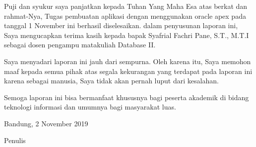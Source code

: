 \begin{acknowledgements}
Puji dan syukur saya panjatkan kepada Tuhan Yang Maha Esa atas berkat dan rahmat-Nya, Tugas pembuatan aplikasi dengan menggunakan oracle apex pada tanggal 1 November ini berhasil diselesaikan. dalam penyusunan laporan ini, Saya mengucapkan terima kasih kepada bapak Syafrial Fachri Pane, S.T., M.T.I sebagai dosen pengampu matakuliah Database II.

Saya menyadari laporan ini jauh dari sempurna. Oleh karena itu, Saya memohon maaf kepada semua pihak atas segala kekurangan yang terdapat pada laporan ini karena sebagai manusia, Saya tidak akan pernah luput dari kesalahan. 

Semoga laporan ini bisa bermanfaat khususnya bagi peserta akademik di bidang teknologi informasi dan umumnya bagi masyarakat luas. 

\begin{raggedleft}

Bandung, 2 November 2019

Penulis

\end{raggedleft}

\end{acknowledgements}